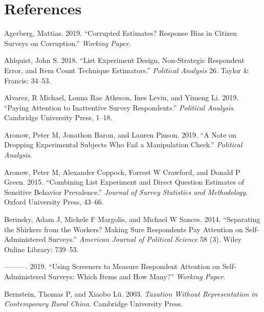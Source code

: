 \documentclass[]{article}
\begin{document}
\newpage

\hypertarget{references}{%
\section{References}\label{references}}

\noindent \setlength{\parindent}{-0.2in} \setlength{\leftskip}{0.2in}

\hypertarget{refs}{}
\leavevmode\hypertarget{ref-agerberg2019corrupted}{}%
Agerberg, Mattias. 2019. ``Corrupted Estimates? Response Bias in Citizen
Surveys on Corruption.'' \emph{Working Paper}.

\leavevmode\hypertarget{ref-ahlquist2018error}{}%
Ahlquist, John S. 2018. ``List Experiment Design, Non-Strategic
Respondent Error, and Item Count Technique Estimators.'' \emph{Political
Analysis} 26. Taylor \& Francis: 34--53.

\leavevmode\hypertarget{ref-alvarez2019paying}{}%
Alvarez, R Michael, Lonna Rae Atkeson, Ines Levin, and Yimeng Li. 2019.
``Paying Attention to Inattentive Survey Respondents.'' \emph{Political
Analysis}. Cambridge University Press, 1--18.

\leavevmode\hypertarget{ref-aronow2019note}{}%
Aronow, Peter M, Jonathon Baron, and Lauren Pinson. 2019. ``A Note on
Dropping Experimental Subjects Who Fail a Manipulation Check.''
\emph{Political Analysis}.

\leavevmode\hypertarget{ref-aronow2015combining}{}%
Aronow, Peter M, Alexander Coppock, Forrest W Crawford, and Donald P
Green. 2015. ``Combining List Experiment and Direct Question Estimates
of Sensitive Behavior Prevalence.'' \emph{Journal of Survey Statistics
and Methodology}. Oxford University Press, 43--66.

\leavevmode\hypertarget{ref-berinsky2014separating}{}%
Berinsky, Adam J, Michele F Margolis, and Michael W Sances. 2014.
``Separating the Shirkers from the Workers? Making Sure Respondents Pay
Attention on Self-Administered Surveys.'' \emph{American Journal of
Political Science} 58 (3). Wiley Online Library: 739--53.

\leavevmode\hypertarget{ref-berinsky2019using}{}%
---------. 2019. ``Using Screeners to Measure Respondent Attention on
Self-Administered Surveys: Which Items and How Many?'' \emph{Working
Paper}.

\leavevmode\hypertarget{ref-bernstein2003taxation}{}%
Bernstein, Thomas P, and Xiaobo Lü. 2003. \emph{Taxation Without
Representation in Contemporary Rural China}. Cambridge University Press.
\end{document}
